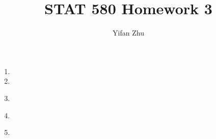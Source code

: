 \documentclass{article}
\begin{document}
	

	
	\title{STAT 580 Homework 3}
	\author{Yifan Zhu}
	\maketitle
	
	\begin{enumerate}[leftmargin = 0 em, label = \arabic*., font = \bfseries]
	\item 
	

	\item 

	\item 

	\ 

	

	\item 

	\ 

	

	\item 

	\ 
	
	
 	\end{enumerate}


	
	
	
	
\end{document}
